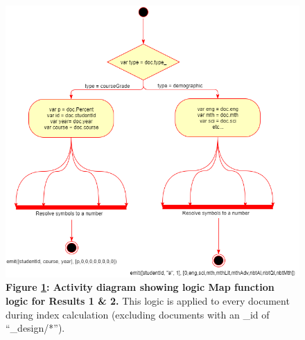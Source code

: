 \begin{figure}[ht]
    \centering
    \begin{mdframed}
        \centering
        \includegraphics[scale=0.35]{./resources/figures/activity-diagram-1.png}
    \end{mdframed}
    \caption[Result 1 Map function]{\textbf{Figure \ref{result-1-map-fn}: Activity diagram showing logic Map function logic for Results 1 \& 2.} This logic is applied to every document during index calculation (excluding documents with an \_id of ``\_design/*'').}
    \label{result-1-map-fn}
\end{figure}